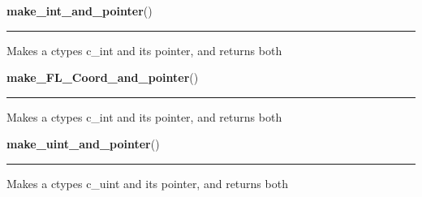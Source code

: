     \label{xformslib:library:make_int_and_pointer}

    \vspace{0.5ex}

\hspace{.8\funcindent}\begin{boxedminipage}{\funcwidth}

    \raggedright \textbf{make\_int\_and\_pointer}()

    \vspace{-1.5ex}

    \rule{\textwidth}{0.5\fboxrule}
\setlength{\parskip}{2ex}
    Makes a ctypes c\_int and its pointer, and returns both

\setlength{\parskip}{1ex}
    \end{boxedminipage}

    \label{xformslib:library:make_int_and_pointer}

    \vspace{0.5ex}

\hspace{.8\funcindent}\begin{boxedminipage}{\funcwidth}

    \raggedright \textbf{make\_FL\_Coord\_and\_pointer}()

    \vspace{-1.5ex}

    \rule{\textwidth}{0.5\fboxrule}
\setlength{\parskip}{2ex}
    Makes a ctypes c\_int and its pointer, and returns both

\setlength{\parskip}{1ex}
    \end{boxedminipage}

    \label{xformslib:library:make_uint_and_pointer}

    \vspace{0.5ex}

\hspace{.8\funcindent}\begin{boxedminipage}{\funcwidth}

    \raggedright \textbf{make\_uint\_and\_pointer}()

    \vspace{-1.5ex}

    \rule{\textwidth}{0.5\fboxrule}
\setlength{\parskip}{2ex}
    Makes a ctypes c\_uint and its pointer, and returns both

\setlength{\parskip}{1ex}
    \end{boxedminipage}

